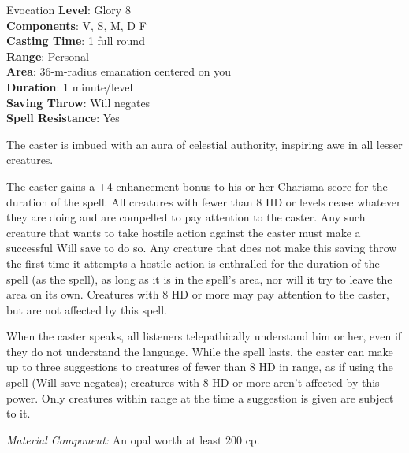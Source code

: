 {Evocation}
{
	\textbf{Level}: Glory 8\\
	\textbf{Components}: V, S, M, D F\\
	\textbf{Casting Time}: 1 full round\\
	\textbf{Range}: Personal\\
	\textbf{Area}: 36-m-radius emanation centered on you\\
	\textbf{Duration}: 1 minute/level\\
	\textbf{Saving Throw}: Will negates\\
	\textbf{Spell Resistance}: Yes\\
}
{
	The caster is imbued with an aura of celestial authority, inspiring awe in all lesser creatures.
	
	The caster gains a +4 enhancement bonus to his or her Charisma score for the duration of the spell. All creatures with fewer than 8 HD or levels cease whatever they are doing and are compelled to pay attention to the caster. Any such creature that wants to take hostile action against the caster must make a successful Will save to do so. Any creature that does not make this saving throw the first time it attempts a hostile action is enthralled for the duration of the spell (as the  spell), as long as it is in the spell’s area, nor will it try to leave the area on its own. Creatures with 8 HD or more may pay attention to the caster, but are not affected by this spell.

	When the caster speaks, all listeners telepathically understand him or her, even if they do not understand the language. While the spell lasts, the caster can make up to three suggestions to creatures of fewer than 8 HD in range, as if using the  spell (Will save negates); creatures with 8 HD or more aren’t affected by this power. Only creatures within range at the time a suggestion is given are subject to it.

	\textit{Material Component:} An opal worth at least 200 cp.
}